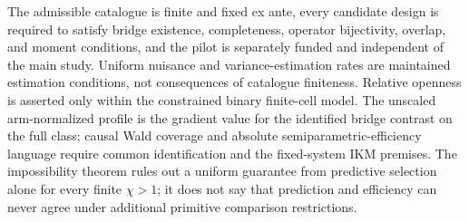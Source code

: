 The admissible catalogue is finite and fixed ex ante, every candidate design is required to satisfy bridge existence, completeness, operator bijectivity, overlap, and moment conditions, and the pilot is separately funded and independent of the main study. Uniform nuisance and variance-estimation rates are maintained estimation conditions, not consequences of catalogue finiteness. Relative openness is asserted only within the constrained binary finite-cell model. The unscaled arm-normalized profile is the gradient value for the identified bridge contrast on the full class; causal Wald coverage and absolute semiparametric-efficiency language require common identification and the fixed-system IKM premises. The impossibility theorem rules out a uniform guarantee from predictive selection alone for every finite \(\chi>1\); it does not say that prediction and efficiency can never agree under additional primitive comparison restrictions.